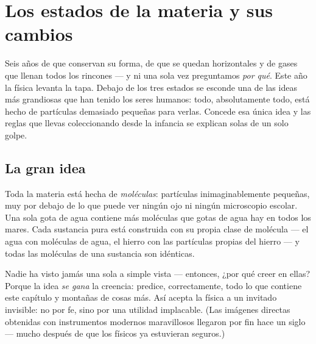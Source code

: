 \chapter{Los estados de la materia y sus cambios}\label{ch:g7:states-of-matter}

Seis años de  que conservan su forma, de  que se
quedan horizontales y de gases que llenan todos los rincones --- y ni
una sola vez preguntamos \emph{por qué}. Este año la física levanta la
tapa. Debajo de los tres estados se esconde una de las ideas más
grandiosas que han tenido los seres humanos: todo, absolutamente todo,
está hecho de partículas demasiado pequeñas para verlas. Concede esa
única idea y las reglas que llevas coleccionando desde la infancia se
explican solas de un solo golpe.

\section{La gran idea}

\begin{definition}\label{def:g7:states-of-matter:molecule}
Toda la materia está hecha de \emph{moléculas}:
partículas inimaginablemente pequeñas, muy por debajo de lo que puede
ver ningún ojo ni ningún microscopio escolar. Una sola gota de agua
contiene más moléculas que gotas de agua hay en todos los mares. Cada
sustancia pura está construida con su propia clase de molécula --- el
agua con moléculas de agua, el hierro con las partículas propias del
hierro --- y todas las moléculas de una sustancia son idénticas.
\end{definition}

\begin{remark}\label{rem:g7:states-of-matter:believing}
Nadie ha visto jamás una sola  a simple vista --- entonces,
¿por qué creer en ellas? Porque la idea \emph{se gana} la creencia:
predice, correctamente, todo lo que contiene este capítulo y montañas
de cosas más. Así acepta la física a un invitado invisible: no por fe,
sino por una utilidad implacable. (Las imágenes directas obtenidas
con instrumentos modernos maravillosos llegaron por fin hace un siglo
--- mucho después de que los físicos ya estuvieran seguros.)
\end{remark}

